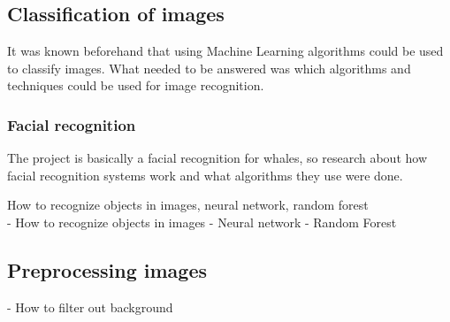 \subsection{Classification of images}
It was known beforehand that using Machine Learning algorithms could be used to classify images. What needed to be answered was which algorithms and techniques could be used for image recognition. 

\subsubsection{Facial recognition}
The project is basically a facial recognition for whales, so research about how facial recognition systems work and what algorithms they use were done. 


%


How to recognize objects in images, neural network, random forest\\
- How to recognize objects in images
	- Neural network
	- Random Forest

\subsection{Preprocessing images}
\label{sec:litterature}
- How to filter out background